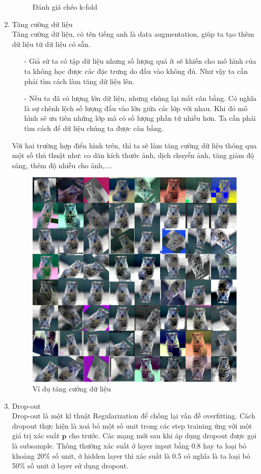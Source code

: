 \begin{enumerate}
\begin{figure}[H]
\begin{center}
\end{center}
\caption{Đánh giá chéo k-fold}
\end{figure} 
\item Tăng cường dữ liệu\\
Tăng cường dữ liệu, có tên tiếng anh là data augmentation, giúp ta tạo thêm dữ liệu từ dữ liệu có sẵn.
\begin{itemize}
\item[-]Giả sử ta có tập dữ liệu nhưng số lượng quá ít sẽ khiến cho mô hình của ta không học được các đặc trưng do đầu vào không đủ. Như vậy ta cần phải tìm cách làm tăng dữ liệu lên.
\item[-]Nếu ta đã có lượng lớn dữ liệu, nhưng chúng lại mất cân bằng. Có nghĩa là sự chênh lệch số lượng đầu vào lớn giữa các lớp với nhau. Khi đó mô hình sẽ ưu tiên những lớp mà có số lượng phần tử nhiều hơn. Ta cần phải tìm cách để dữ liệu chúng ta được cân bằng.
\end{itemize}
Với hai trường hợp điển hình trên, thì ta sẽ làm tăng cường dữ liệu thông qua một số thủ thuật như: co dãn kích thước ảnh, dịch chuyển ảnh, tăng giảm độ sáng, thêm độ nhiễu cho ảnh,....
\begin{figure}[H]
\begin{center}
\includegraphics[scale=0.3]{chap3/image/dataaug.jpg}
\end{center}
\caption{Ví dụ tăng cường dữ liệu}
\end{figure}   
\item Drop-out\\
Drop-out \cite{srivastava2014dropout} là một kĩ thuật Regularization để chống lại vấn đề overfitting. Cách dropout thực hiện là xoá bỏ một số unit trong các step training ứng với một giá trị xác suất $\textbf{p}$ cho trước. Các mạng mới sau khi áp dụng dropout được gọi là subsample. Thông thường xác suất ở layer input bằng 0.8 hay ta loại bỏ khoảng 20\% số unit, ở hidden layer thì xác suất là 0.5 có nghĩa là ta loại bỏ 50\% số unit ở layer sử dụng dropout.


\end{enumerate}
